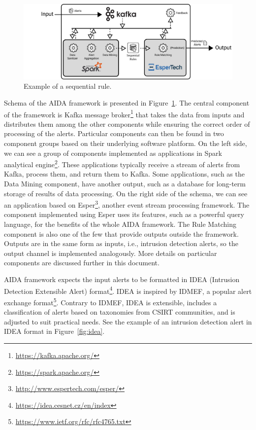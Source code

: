 \documentclass[a4paper]{article} %
\begin{document}
\begin{figure}[h]
\includegraphics[width=\textwidth]{fig/aida_schema}
\caption{Example of a sequential rule.}
\label{fig:aida}
\end{figure}

Schema of the AIDA framework is presented in Figure~\ref{fig:aida}. The central component of the framework is Kafka message broker\footnote{\url{https://kafka.apache.org/}} that takes the data from inputs and distributes them among the other components while ensuring the correct order of processing of the alerts. Particular components can then be found in two component groups based on their underlying software platform. On the left side, we can see a group of components implemented as applications in Spark analytical engine\footnote{\url{https://spark.apache.org/}}. These applications typically receive a stream of alerts from Kafka, process them, and return them to Kafka. Some applications, such as the Data Mining component, have another output, such as a database for long-term storage of results of data processing. On the right side of the schema, we can see an application based on Esper\footnote{\url{http://www.espertech.com/esper/}}, another event stream processing framework. The component implemented using Esper uses its features, such as a powerful query language, for the benefits of the whole AIDA framework. The Rule Matching component is also one of the few that provide outputs outside the framework. Outputs are in the same form as inputs, i.e., intrusion detection alerts, so the output channel is implemented analogously. More details on particular components are discussed further in this document.

\bigskip

AIDA framework expects the input alerts to be formatted in IDEA (Intrusion Detection Extensible Alert) format\footnote{\url{https://idea.cesnet.cz/en/index}}. IDEA is inspired by IDMEF, a popular alert exchange format\footnote{\url{https://www.ietf.org/rfc/rfc4765.txt}}. Contrary to IDMEF, IDEA is extensible, includes a classification of alerts based on taxonomies from CSIRT communities, and is adjusted to suit practical needs. See the example of an intrusion detection alert in IDEA format in Figure~\ref{fig:idea}.
\end{document}
